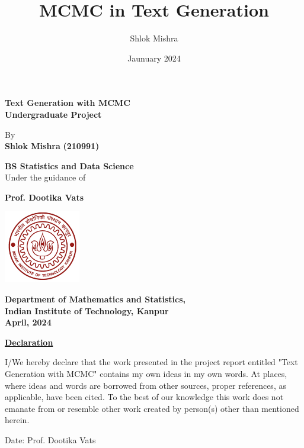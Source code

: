 \documentclass[12pt]{article}
\title{MCMC in Text Generation}
\author{Shlok Mishra}
\date{Jaunuary 2024}
\begin{document}
\doublespacing
\thispagestyle{empty}
\begin{center}
\textbf{ \Large
Text Generation with MCMC\\
}
\vspace*{1cm}
\textbf{Undergraduate Project} 
\vspace*{1cm}

By \\
\vspace*{1cm}
\textbf{Shlok Mishra} 
\textbf{(210991)}

\textbf{BS Statistics and Data Science}
\vspace*{1cm} \\
Under the guidance of

\textbf{Prof. Dootika Vats}
\vspace*{1cm}
\begin{center}
\includegraphics[width=0.25\textwidth]{iitklogo.jpg}
\end{center}

\textbf{Department of Mathematics and Statistics, \\ Indian Institute of Technology, Kanpur \\ April, 2024}
\end{center}

\newpage
\onehalfspacing
\thispagestyle{empty}
\vspace*{2cm}
\begin{center}
\textbf{\underline{Declaration}}
\end{center}
\vspace*{1cm}
{I/We hereby declare that the work presented in the project report entitled "Text Generation with MCMC" contains my own ideas in my own words. At places, where ideas and words are borrowed from other sources, proper references, as applicable, have been cited. To the
best of our knowledge this work does not emanate from or resemble other work created
by person(s) other than mentioned herein.}
\vspace*{2cm}

\noindent Date: \hspace{8.5cm} Prof. Dootika Vats
\end{document}
